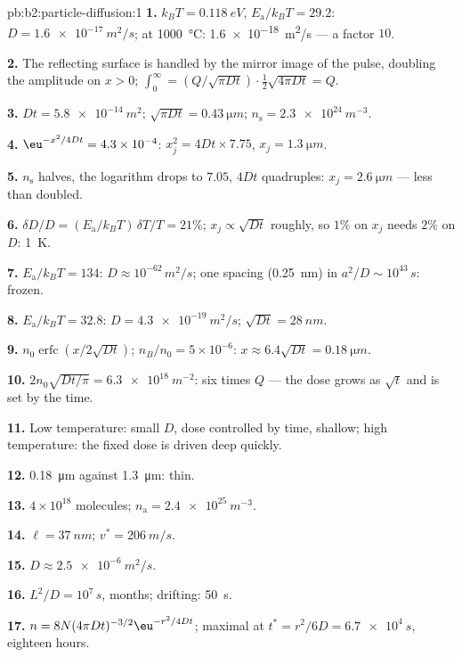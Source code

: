 \begin{solution}{pb:b2:particle-diffusion:1}
\textbf{1.} $k_BT = \qty{0.118}{eV}$, $E_{\text{a}}/k_BT = 29.2$: $D =
\qty{1.6e-17}{m^2/s}$; at \qty{1000}{\celsius}: \qty{1.6e-18}{m^2/s} --- a
factor $10$.

\textbf{2.} The reflecting surface is handled by the mirror image of the
pulse, doubling the amplitude on $x > 0$; $\int_0^\infty = (Q/\sqrt{\pi Dt})
\cdot \tfrac12\sqrt{4\pi Dt} = Q$.

\textbf{3.} $Dt = \qty{5.8e-14}{m^2}$; $\sqrt{\pi Dt} = \qty{0.43}{\micro m}$; $n_{\text{s}}
= \qty{2.3e24}{m^{-3}}$.

\textbf{4.} $\eu^{-x^2/4Dt} = 4.3 \times 10^{-4}$: $x_j^2 = 4Dt \times 7.75$, $x_j =
\qty{1.3}{\micro m}$.

\textbf{5.} $n_{\text{s}}$ halves, the logarithm drops to $7.05$, $4Dt$
quadruples: $x_j = \qty{2.6}{\micro m}$ --- less than doubled.

\textbf{6.} $\delta D/D = (E_{\text{a}}/k_BT)\,\delta T/T = 21\%$; $x_j \propto
\sqrt{Dt}$ roughly, so $1\%$ on $x_j$ needs $2\%$ on $D$: \qty{1}{K}.

\textbf{7.} $E_{\text{a}}/k_BT = 134$: $D \approx 10^{-62}\,\unit{m^2/s}$; one
spacing (\qty{0.25}{nm}) in $a^2/D \sim 10^{43}\,\unit{s}$: frozen.

\textbf{8.} $E_{\text{a}}/k_BT = 32.8$: $D = \qty{4.3e-19}{m^2/s}$; $\sqrt{Dt} =
\qty{28}{nm}$.

\textbf{9.} $n_0\operatorname{erfc}(x/2\sqrt{Dt})$; $n_B/n_0 = 5 \times 10^{-6}$:
$x \approx 6.4\sqrt{Dt} = \qty{0.18}{\micro m}$.

\textbf{10.} $2n_0\sqrt{Dt/\pi} = \qty{6.3e18}{m^{-2}}$: six times $Q$ ---
the dose grows as $\sqrt t$ and is set by the time.

\textbf{11.} Low temperature: small $D$, dose controlled by time,
shallow; high temperature: the fixed dose is driven deep quickly.

\textbf{12.} \qty{0.18}{\micro m} against \qty{1.3}{\micro m}: thin.

\textbf{13.} $4 \times 10^{18}$ molecules; $n_{\text{a}} = \qty{2.4e25}{m^{-3}}$.

\textbf{14.} $\ell = \qty{37}{nm}$; $v^* = \qty{206}{m/s}$.

\textbf{15.} $D \approx \qty{2.5e-6}{m^2/s}$.

\textbf{16.} $L^2/D = 10^7\,\unit{s}$, months; drifting: \qty{50}{s}.

\textbf{17.} $n = 8N(4\pi Dt)^{-3/2}\eu^{-r^2/4Dt}$; maximal at $t^* = r^2/6D =
\qty{6.7e4}{s}$, eighteen hours.


\end{solution}
